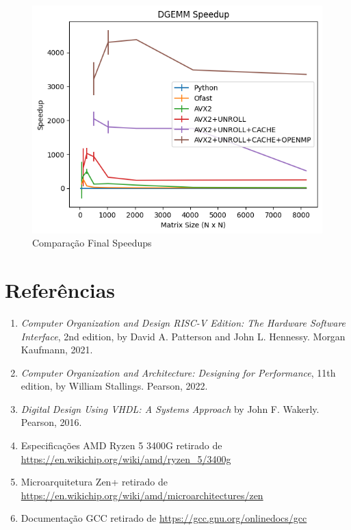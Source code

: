 \documentclass[12pt]{article}
\begin{document}
\begin{figure}[h]
    \centering
    \includegraphics[scale=0.6]{figures/all_speedups_sizes.png}
    \caption{Comparação Final Speedups}
    \label{fig:speedups-final}
\end{figure}

\newpage
\newpage

\section{Referências}

\begin{enumerate}
\item \textit{Computer Organization and Design RISC-V Edition: The Hardware Software Interface}, 2nd edition, by David A. Patterson and John L. Hennessy. Morgan Kaufmann, 2021.

\item \textit{Computer Organization and Architecture: Designing for Performance}, 11th edition, by William Stallings. Pearson, 2022.

\item \textit{Digital Design Using VHDL: A Systems Approach} by John F. Wakerly. Pearson, 2016.

\item Especificações AMD Ryzen 5 3400G retirado de \url{https://en.wikichip.org/wiki/amd/ryzen_5/3400g}

\item Microarquitetura Zen+ retirado de \url{https://en.wikichip.org/wiki/amd/microarchitectures/zen}

\item Documentação GCC retirado de \url{https://gcc.gnu.org/onlinedocs/gcc}

\end{enumerate}
\end{document}
